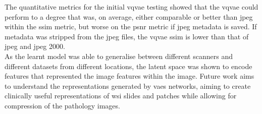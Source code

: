 \documentclass[review]{elsarticle}
\begin{document}

The quantitative metrics for the initial \gls{vqvae} testing showed that the \gls{vqvae} could perform to a degree that was, on average, either comparable or better than \gls{jpeg} within the \gls{ssim} metric, but worse on the \gls{psnr} metric if \gls{jpeg} metadata is saved. If metadata was stripped from the \gls{jpeg} files, the \gls{vqvae} \gls{ssim} is lower than that of \gls{jpeg} and \gls{jpeg} 2000. \\
As the learnt model was able to generalise between different scanners and different datasets from different locations, the latent space was shown to encode features that represented the image features within the image. Future work aims to understand the representations generated by \glspl{vae} networks, aiming to create clinically useful representations of \gls{wsi} slides and patches while allowing for compression of the pathology images.

\end{document}
